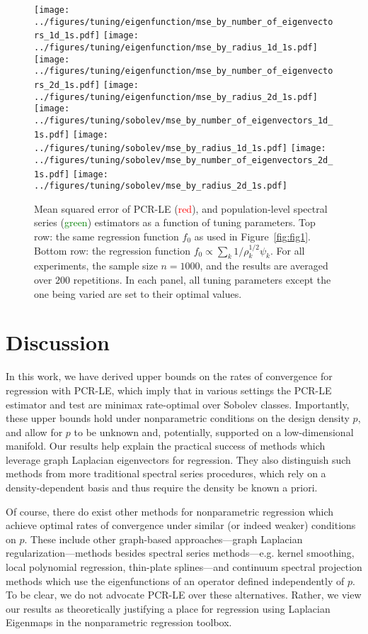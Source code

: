 \begin{figure*}[tb]
	\texttt{[image: ../figures/tuning/eigenfunction/mse\_by\_number\_of\_eigenvectors\_1d\_1s.pdf]}
	\texttt{[image: ../figures/tuning/eigenfunction/mse\_by\_radius\_1d\_1s.pdf]} 
	\texttt{[image: ../figures/tuning/eigenfunction/mse\_by\_number\_of\_eigenvectors\_2d\_1s.pdf]}
	\texttt{[image: ../figures/tuning/eigenfunction/mse\_by\_radius\_2d\_1s.pdf]} 
	\texttt{[image: ../figures/tuning/sobolev/mse\_by\_number\_of\_eigenvectors\_1d\_1s.pdf]}
	\texttt{[image: ../figures/tuning/sobolev/mse\_by\_radius\_1d\_1s.pdf]}
	\texttt{[image: ../figures/tuning/sobolev/mse\_by\_number\_of\_eigenvectors\_2d\_1s.pdf]}
	\texttt{[image: ../figures/tuning/sobolev/mse\_by\_radius\_2d\_1s.pdf]}  
	\caption{Mean squared error of PCR-LE (\textcolor{red}{red}), and population-level spectral series (\textcolor{green}{green}) estimators as a function of tuning parameters. Top row: the same regression function $f_0$ as used in Figure~\ref{fig:fig1}. Bottom row: the regression function $f_0 \propto \sum_{k} 1/\rho_k^{1/2} \psi_k$. For all experiments, the sample size $n = 1000$, and the results are averaged over $200$ repetitions. In each panel, all tuning parameters except the one being varied are set to their optimal values.}
	\label{fig:fig3}
\end{figure*}

\section{Discussion}
\label{sec:discussion}

In this work, we have derived upper bounds on the rates of convergence for regression with PCR-LE, which imply that in various settings the PCR-LE estimator and test are minimax rate-optimal over Sobolev classes. Importantly, these upper bounds hold under nonparametric conditions on the design density $p$, and allow for $p$ to be unknown and, potentially, supported on a low-dimensional manifold. Our results help explain the practical success of methods which leverage graph Laplacian eigenvectors for regression. They also distinguish such methods from more traditional spectral series procedures, which rely on a density-dependent basis and thus require the density be known a priori.

Of course, there do exist other methods for nonparametric regression which achieve optimal rates of convergence under similar (or indeed weaker) conditions on $p$. These include other graph-based approaches---graph Laplacian regularization---methods besides spectral series methods---e.g. kernel smoothing, local polynomial regression, thin-plate splines---and continuum spectral projection methods which use the eigenfunctions of an operator defined independently of $p$. To be clear, we do not advocate PCR-LE over these alternatives. Rather, we view our results as theoretically justifying a place for regression using Laplacian Eigenmaps in the nonparametric regression toolbox. 

